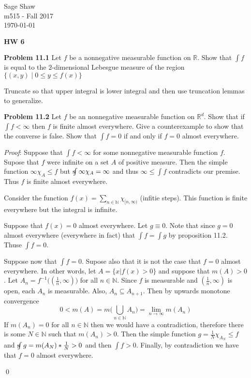 \documentclass[12pt]{article}
\newcommand{\problem}[1]{\hspace{-4 ex} \large \textbf{Problem #1} }
\newcommand{\sint}{\text{s}\kern-5pt\int}
\renewenvironment{proof}{\hspace{-4 ex} \emph{Proof}:}{\qed}
\begin{document}
	\thispagestyle{empty}
	
	\begin{flushright}
		Sage Shaw \\
		m515 - Fall 2017 \\
		\today
	\end{flushright}
	
{\large \textbf{HW 6}}\bigbreak

\problem{11.1} Let $f$ be a nonnegative measurable function on $\mathbb{R}$. Show that $\int f$ is equal to the $2$-dimensional Lebesgue measure of the region $\{(x,y)\mid 0\leq y \leq f(x) \}$

	Truncate so that upper integral is lower integral and then use truncation lemmas to generalize.

\problem{11.2} Let $f$ be an nonnegative measurable function on $\mathbb{R}^d$. Show that if $\int f<\infty$ then $f$ is finite almost everywhere. Give a counterexample to show that the converse is false. Show that $\int f=0$ if and only if $f=0$ almost everywhere.

	\begin{proof}
 		Suppose that $\int f<\infty$ for some nonnegative measurable function $f$. Supose that $f$ were infinite on a set $A$ of positive measure. Then the simple function $\infty \chi_A \leq f$ but $\sint \infty \chi_A = \infty$ and thus $ \infty \leq \int f$ contradicts our premise. Thus $f$ is finite almost everywhere. \bigbreak
 		
 		Consider the function $f(x) = \sum\limits_{n\in \mathbb{N}} \chi_{[n, \infty)}$ (infitie steps). This function is finite everywhere but the integral is infinite. \bigbreak
 		
 		Suppose that $f(x)=0$ almost everywhere. Let $g \equiv 0$. Note that since $g = 0$ almost everywhere (everywhere in fact) that $\int f = \int g$ by proposition 11.2. Thuse $\int f = 0$.
 		
 		Suppose now that $\int f = 0$. Supose also that it is not the case that $f=0$ almost everywhere. In other words, let $A = \{x \vert f(x)>0\}$ and suppose that $m(A) > 0$. Let $A_n = f^{-1} \Big( (\tfrac{1}{n},\infty) \Big)$ for all $n \in \mathbb{N}$. Since $f$ is measurable and $(\tfrac{1}{n},\infty)$ is open, each $A_n$ is measurable. Also, $A_n \subseteq A_{n+1}$. Then by upwards monotone convergence
 		$$
 		0< m(A) = m \Big( \bigcup_{n \in \mathbb{N}} A_n \Big ) = \lim_{n \to \infty} m(A_n)
 		$$
 		If $m(A_n)=0$ for all $n \in \mathbb{N}$ then we would have a contradiction, therefore there is some $N \in \mathbb{N}$ such that $m(A_n)>0$. Then the simple function $g = \tfrac{1}{N}\chi_{A_N} \leq f$ and $\sint g = m(A_N)*\tfrac{1}{N} > 0$ and then $\int f >0$. Finally, by contradiction we have that $f=0$ almost everywhere.
 		
	\end{proof}
\end{document}
